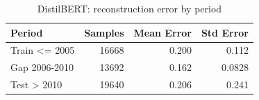 \begin{table}[ht]
\centering
\caption{DistilBERT: reconstruction error by period}
\label{tab:distilbert_period_error_summary}
\begin{tabular}{lrrr}
\toprule
Period & Samples & Mean Error & Std Error \\
\midrule
Train <= 2005 & 16668 & 0.200 & 0.112 \\
Gap 2006-2010 & 13692 & 0.162 & 0.0828 \\
Test > 2010 & 19640 & 0.206 & 0.241 \\
\bottomrule
\end{tabular}
\end{table}
